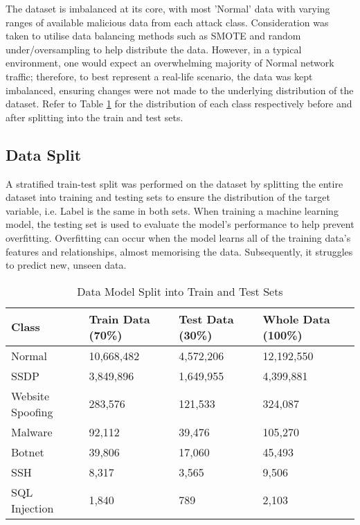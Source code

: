 The dataset is imbalanced at its core, with most 'Normal' data with varying ranges of available malicious data from each attack class. Consideration was taken to utilise data balancing methods such as SMOTE and random under/oversampling to help distribute the data. However, in a typical environment, one would expect an overwhelming majority of Normal network traffic; therefore, to best represent a real-life scenario, the data was kept imbalanced, ensuring changes were not made to the underlying distribution of the dataset. Refer to Table \ref{tab:split_data} for the distribution of each class respectively before and after splitting into the train and test sets.


\subsection{Data Split}

A stratified train-test split was performed on the dataset by splitting the entire dataset into training and testing sets to ensure the distribution of the target variable, i.e. Label is the same in both sets. When training a machine learning model, the testing set is used to evaluate the model's performance to help prevent overfitting. Overfitting can occur when the model learns all of the training data's features and relationships, almost memorising the data. Subsequently, it struggles to predict new, unseen data.

\begin{table}[H]
\begin{tabular}{llll}
\textbf{Class}   & \textbf{Train Data (70\%)} & \textbf{Test Data (30\%)} & \textbf{Whole Data (100\%)} \\ \hline
Normal           & 10,668,482                       &   4,572,206           & 12,192,550                  \\
SSDP             & 3,849,896                &     1,649,955            & 4,399,881                   \\
Website Spoofing & 283,576            &     121,533       & 324,087                     \\
Malware          &  92,112                     &     39,476               & 105,270                     \\
Botnet           & 39,806                    &     17,060          & 45,493                      \\
SSH              & 8,317              &       3,565             & 9,506                       \\
SQL Injection    & 1,840                &     789                  & 2,103                  \\ \hline
\end{tabular}
\caption{Data Model Split into Train and Test Sets}
\label{tab:split_data}
\end{table}

